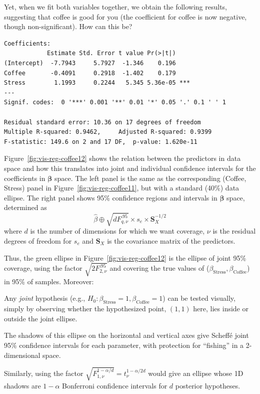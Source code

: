 \documentclass[11pt]{article}%
\newcommand*{\figref}[1]{Figure~\ref{#1}}
\renewcommand*{\vec}[1]{\ensuremath{\bm{#1}}}
\newcommand*{\mat}[1]{\ensuremath{\bm{#1}}}
\begin{document}
Yet, when we fit both variables together, we obtain the following results,
suggesting that coffee is good for you (the coefficient for coffee is now
negative, though non-significant).  How can this be?

\begin{verbatim}
Coefficients:
            Estimate Std. Error t value Pr(>|t|)    
(Intercept)  -7.7943     5.7927  -1.346    0.196    
Coffee       -0.4091     0.2918  -1.402    0.179    
Stress        1.1993     0.2244   5.345 5.36e-05 ***
---
Signif. codes:  0 '***' 0.001 '**' 0.01 '*' 0.05 '.' 0.1 ' ' 1 

Residual standard error: 10.36 on 17 degrees of freedom
Multiple R-squared: 0.9462,     Adjusted R-squared: 0.9399 
F-statistic: 149.6 on 2 and 17 DF,  p-value: 1.620e-11 
\end{verbatim}

\figref{fig:vis-reg-coffee12} shows the relation between the
predictors in data space and how this translates into joint and
individual confidence intervals for the coefficients in 
$\vec{\beta}$ space.  The left panel is the same as the corresponding
(Coffee, Stress) panel in \figref{fig:vis-reg-coffee11}, but with
a standard (40\%) data ellipse. The right panel shows 95\% confidence
regions and intervals in $\vec{\beta}$ space, determined as
\begin{equation*}
 \widehat{\beta} \oplus \sqrt{d F^{.95}_{q, \nu}} \times s_e \times \mat{S}_X^{-1/2}
\end{equation*}
where $d$ is the number of dimensions for which we want coverage,
$\nu$ is the residual degrees of freedom for $s_e$ and $\mat{S}_X$
is the covariance matrix of the predictors.  

Thus, the green ellipse in \figref{fig:vis-reg-coffee12} is the
ellipse of joint 95\% coverage, using the factor $\sqrt{2 F^{.95}_{2, \nu}}$
and covering the true values of ($\beta_{\mathrm{Stress}}, \beta_{\mathrm{Coffee}}$)
in 95\% of samples.  Moreover:
\begin{itemize*}
  \item Any \emph{joint} hypothesis (e.g., $H_0:\beta_{\mathrm{Stress}}=1, \beta_{\mathrm{Coffee}}=1$)
can be tested visually, simply by observing whether the
hypothesized point, $(1, 1)$ here, lies inside or outside the joint ellipse.
  \item The shadows of this ellipse on the horizontal and vertical axes
give Scheff\'e joint 95\%  confidence intervals for each parameter, with protection for ``fishing''
in a 2-dimensional space.  
  \item Similarly, using the factor
$\sqrt{F^{1-\alpha/d}_{1, \nu}} = t^{1-\alpha/2d}_\nu$ would give an
ellipse whose 1D shadows are $1-\alpha$ Bonferroni confidence intervals
for $d$ posterior hypotheses.
\end{itemize*}
\end{document}
